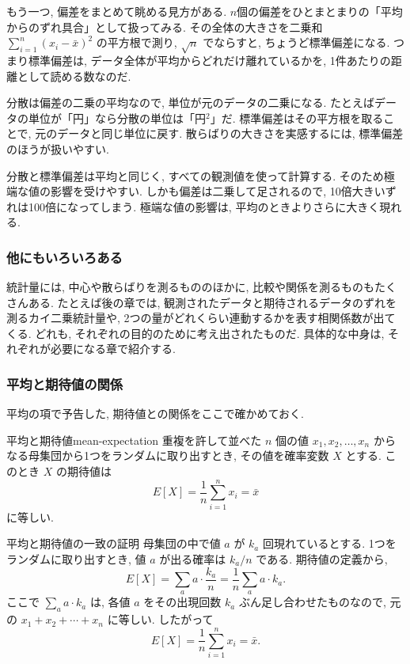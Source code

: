     もう一つ, 偏差をまとめて眺める見方がある.
    $n$個の偏差をひとまとまりの「平均からのずれ具合」として扱ってみる.
    その全体の大きさを二乗和 $\sum_{i=1}^{n}(x_i - \bar{x})^2$ の平方根で測り, $\sqrt{n}$ でならすと, ちょうど標準偏差になる.
    つまり標準偏差は, データ全体が平均からどれだけ離れているかを, 1件あたりの距離として読める数なのだ.

    分散は偏差の二乗の平均なので, 単位が元のデータの二乗になる.
    たとえばデータの単位が「円」なら分散の単位は「円${}^2$」だ.
    標準偏差はその平方根を取ることで, 元のデータと同じ単位に戻す.
    散らばりの大きさを実感するには, 標準偏差のほうが扱いやすい.

    分散と標準偏差は平均と同じく, すべての観測値を使って計算する.
    そのため極端な値の影響を受けやすい.
    しかも偏差は二乗して足されるので, 10倍大きいずれは100倍になってしまう.
    極端な値の影響は, 平均のときよりさらに大きく現れる.

    \subsubsection*{他にもいろいろある}

    統計量には, 中心や散らばりを測るもののほかに, 比較や関係を測るものもたくさんある.
    たとえば後の章では, 観測されたデータと期待されるデータのずれを測るカイ二乗統計量や, 2つの量がどれくらい連動するかを表す相関係数が出てくる.
    どれも, それぞれの目的のために考え出されたものだ.
    具体的な中身は, それぞれが必要になる章で紹介する.

    \subsubsection*{平均と期待値の関係}

    平均の項で予告した, 期待値との関係をここで確かめておく.

    \begin{prop}{平均と期待値}{mean-expectation}
      重複を許して並べた $n$ 個の値 $x_1, x_2, \ldots, x_n$ からなる母集団から1つをランダムに取り出すとき, その値を確率変数 $X$ とする.
      このとき $X$ の期待値は
      \[
        E[X] = \frac{1}{n} \sum_{i=1}^{n} x_i = \bar{x}
      \]
      に等しい.
    \end{prop}

    \begin{mybox}{平均と期待値の一致の証明}
      母集団の中で値 $a$ が $k_a$ 回現れているとする.
      1つをランダムに取り出すとき, 値 $a$ が出る確率は $k_a / n$ である.
      期待値の定義から,
      \[
        E[X] = \sum_{a} a \cdot \frac{k_a}{n} = \frac{1}{n} \sum_{a} a \cdot k_a.
      \]
      ここで $\sum_{a} a \cdot k_a$ は, 各値 $a$ をその出現回数 $k_a$ ぶん足し合わせたものなので, 元の $x_1 + x_2 + \cdots + x_n$ に等しい.
      したがって
      \[
        E[X] = \frac{1}{n} \sum_{i=1}^{n} x_i = \bar{x}.
      \]
    \end{mybox}

